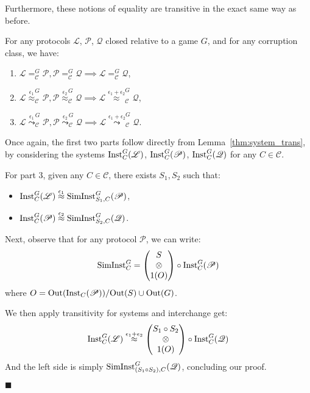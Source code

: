 Furthermore, these notions of equality are transitive in the exact same way
as before.

\begin{theorem}
  \label{thm:trans_relative_equality}
  For any protocols $\mathscr{L}$, $\mathscr{P}$, $\mathscr{Q}$
  closed relative to a game $G$, and for any corruption class, we have:
  \begin{enumerate}
    \item $\mathscr{L} =_{\mathscr{C}}^G \mathscr{P}, \mathscr{P} =_{\mathscr{C}}^G \mathscr{Q} \implies \mathscr{L} =_{\mathscr{C}}^G \mathscr{Q}$,
    \item $\mathscr{L} \overset{\epsilon_1}{\approx}_{\mathscr{C}}^G \mathscr{P}, \mathscr{P} \overset{\epsilon_2}{\approx}_{\mathscr{C}}^G \mathscr{Q} \implies \mathscr{L} \overset{\epsilon_1 + \epsilon_2}{\approx}_{\mathscr{C}}^G \mathscr{Q}$,
    \item $\mathscr{L} \overset{\epsilon_1}{\leadsto}_{\mathscr{C}}^G \mathscr{P}, \mathscr{P} \overset{\epsilon_2}{\leadsto}_{\mathscr{C}}^G \mathscr{Q} \implies \mathscr{L} \overset{\epsilon_1 + \epsilon_2}{\leadsto}_{\mathscr{C}}^G \mathscr{Q}$.
  \end{enumerate}

   Once again, the first two parts follow directly from Lemma~\ref{thm:system_trans},
  by considering the systems $\text{Inst}^G_C(\mathscr{L})$, $\text{Inst}^G_C(\mathscr{P})$,
  $\text{Inst}^G_C(\mathscr{Q})$ for any $C \in \mathscr{C}$.

  For part 3, given any $C \in \mathscr{C}$, there exists $S_1, S_2$ such that:
  \begin{itemize}
    \item $\text{Inst}^G_C(\mathscr{L}) \overset{\epsilon_1}{\approx} \text{SimInst}^G_{S_1, C}(\mathscr{P})$,
    \item $\text{Inst}^G_C(\mathscr{P}) \overset{\epsilon_2}{\approx} \text{SimInst}^G_{S_2, C}(\mathscr{Q})$.
  \end{itemize}
  Next, observe that for any protocol $\mathscr{P}$, we can write:
  $$
  \text{SimInst}^G_C =
  \begin{pmatrix}
    S\cr
    \otimes\cr
    1(O)
  \end{pmatrix}
  \circ
  \text{Inst}^G_C(\mathscr{P})
  $$
  where $O = \text{Out}(\text{Inst}_C(\mathscr{P})) / \text{Out}(S) \cup \text{Out}(G)$.

  We then apply transitivity for systems and interchange get:
  $$
  \text{Inst}^G_C(\mathscr{L}) \overset{\epsilon_1 + \epsilon_2}{\approx}
  \begin{pmatrix}
    S_1 \circ S_2\cr
    \otimes\cr
    1(O)
  \end{pmatrix}
  \circ
  \text{Inst}^G_C(\mathscr{Q})
  $$
  And the left side is simply $\text{SimInst}^G_{(S_1 \circ S_2), C}(\mathscr{Q})$,
  concluding our proof.

  $\blacksquare$
\end{theorem}


